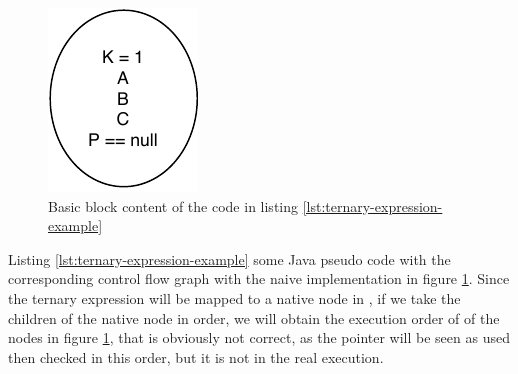\begin{figure}[h]
	\caption{Basic block content of the code in listing \ref{lst:ternary-expression-example}}
	\label{figure:basic-block-content}
	\includegraphics[]{figure/basic-block-content.pdf}
\end{figure}


Listing \ref{lst:ternary-expression-example} some Java pseudo code with the corresponding control flow graph with the naive implementation in figure \ref{figure:basic-block-content}.
Since the ternary expression will be mapped to a native node in \slang{}, if we take the children of the native node in order, we will obtain the execution order of of the nodes in figure \ref{figure:basic-block-content}, that is obviously not correct, as the pointer will be seen as used then checked in this order, but it is not in the real execution.


